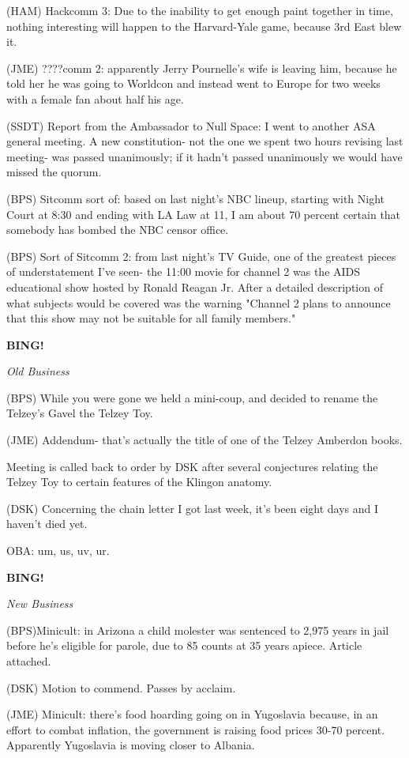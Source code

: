 \documentclass[12pt]{article}
\newcommand{\bing}{{\bf BING!} }
\newcommand{\goto}[1]{\bing \vskip 12pt \centerline{{\em{#1}}}}
\begin{document}
(HAM) Hackcomm 3: Due to the inability to get enough paint together in time, nothing interesting will happen to the Harvard-Yale game, because 3rd East blew it.

(JME) ????comm 2: apparently Jerry Pournelle's wife is leaving him, because he told her he was going to Worldcon and instead went to Europe for two weeks with a female fan about half his age.

(SSDT) Report from the Ambassador to Null Space: I went to another ASA general meeting. A new constitution- not the one we spent two hours revising last meeting- was passed unanimously; if it hadn't passed unanimously we would have missed the quorum.

(BPS) Sitcomm sort of: based on last night's NBC lineup, starting with Night Court at 8:30 and ending with LA Law at 11, I am about 70 percent certain that somebody has bombed the NBC censor office.

(BPS) Sort of Sitcomm 2: from last night's TV Guide, one of the greatest pieces of understatement I've seen- the 11:00 movie for channel 2 was the AIDS educational show hosted by Ronald Reagan Jr. After a detailed description of what subjects would be covered was the warning "Channel 2 plans to announce that this show may not be suitable for all family members."

\goto{Old Business}

(BPS) While you were gone we held a mini-coup, and decided to rename the Telzey's Gavel the Telzey Toy.

(JME) Addendum- that's actually the title of one of the Telzey Amberdon books.

Meeting is called back to order by DSK after several conjectures relating the Telzey Toy to certain features of the Klingon anatomy.

(DSK) Concerning the chain letter I got last week, it's been eight days and I haven't died yet.

OBA: um, us, uv, ur.

\goto{New Business}

(BPS)Minicult: in Arizona a child molester was sentenced to 2,975 years in jail before he's eligible for parole, due to 85 counts at 35 years apiece. Article attached.

(DSK) Motion to commend. Passes by acclaim.

(JME) Minicult: there's food hoarding going on in Yugoslavia because, in an effort to combat inflation, the government is raising food prices 30-70 percent. Apparently Yugoslavia is moving closer to Albania.
\end{document}
